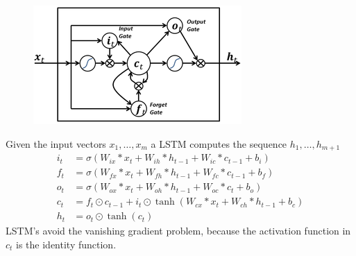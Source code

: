 \documentclass[11pt, a4paper, landscape]{article}
\begin{document}
\vfill
\begin{figure}[H]
\begin{center}
  \includegraphics[width=.5\textwidth]{../article/img/Long_Short_Term_Memory}
\end{center}
\end{figure}
\vfill
Given the input vectors $x_1,\dots,x_m$ a LSTM computes the sequence $h_1,\dots, h_{m+1}$
\begin{equation}
\begin{aligned}  
  i_t &=\sigma(W_{ix} * x_t  + W_{ih} * h_{t-1} + W_{ic} * c_{t-1} + b_i) \\  
  f_t &=\sigma(W_{fx} * x_t  + W_{fh} * h_{t-1} + W_{fc} * c_{t-1} + b_f) \\
  o_t &=\sigma(W_{ox} * x_t  + W_{oh} * h_{t-1} + W_{oc} * c_t + b_o) \\  
  c_t &= f_t \odot c_{t-1} + i_t \odot \tanh(W_{cx} * x_t  + W_{ch} * h_{t-1} + b_c) \\ 
  h_t &= o_t \odot \tanh(c_t) 
\end{aligned}
\end{equation}
\vfill
LSTM's avoid the vanishing gradient problem, because
the activation function in $c_t$ is the identity function.
\vfill

\NewPage{}
\end{document}
